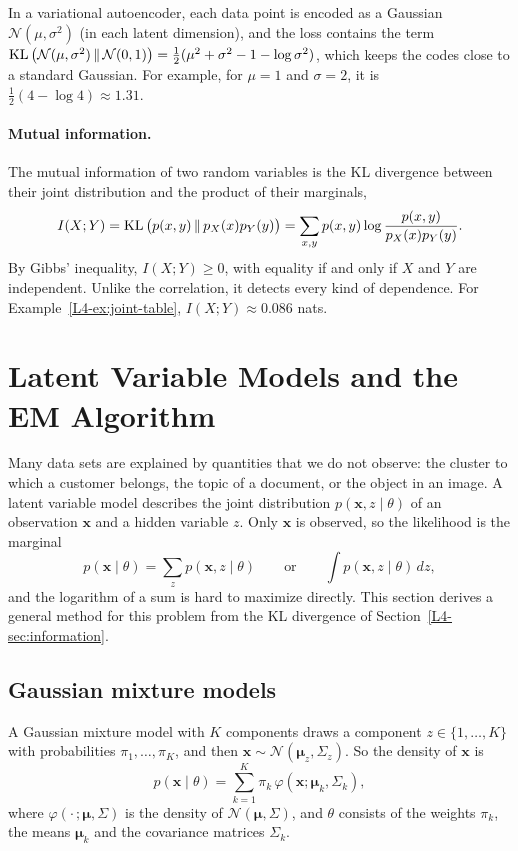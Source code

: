 In a variational autoencoder, each data point is encoded as a Gaussian $\mathcal{N}(\mu, \sigma^2)$ (in each latent dimension), and the loss contains the term $\operatorname{KL}\big(\mathcal{N}(\mu, \sigma^2) \,\|\, \mathcal{N}(0, 1)\big) = \frac{1}{2}(\mu^2 + \sigma^2 - 1 - \log\sigma^2)$, which keeps the codes close to a standard Gaussian. For example, for $\mu = 1$ and $\sigma = 2$, it is $\frac{1}{2}(4 - \log 4) \approx 1.31$.

\paragraph{Mutual information.} The mutual information of two random variables is the KL divergence between their joint distribution and the product of their marginals,
\[I(X; Y) = \operatorname{KL}\big(p(x, y) \,\|\, p_X(x)p_Y(y)\big) = \sum_{x, y} p(x, y)\log\frac{p(x, y)}{p_X(x)p_Y(y)}.\]
By Gibbs' inequality, $I(X; Y) \geq 0$, with equality if and only if $X$ and $Y$ are independent. Unlike the correlation, it detects every kind of dependence. For Example~\ref{L4-ex:joint-table}, $I(X; Y) \approx 0.086$ nats.

\section{Latent Variable Models and the EM Algorithm}\label{L4-sec:latent}

Many data sets are explained by quantities that we do not observe: the cluster to which a customer belongs, the topic of a document, or the object in an image. A latent variable model describes the joint distribution $p(\mathbf{x}, z \mid \theta)$ of an observation $\mathbf{x}$ and a hidden variable $z$. Only $\mathbf{x}$ is observed, so the likelihood is the marginal
\[p(\mathbf{x} \mid \theta) = \sum_z p(\mathbf{x}, z \mid \theta) \qquad \text{or} \qquad \int p(\mathbf{x}, z \mid \theta)\, dz,\]
and the logarithm of a sum is hard to maximize directly. This section derives a general method for this problem from the KL divergence of Section~\ref{L4-sec:information}.

\subsection{Gaussian mixture models}

\begin{definition}\label{L4-def:gmm}
    A Gaussian mixture model with $K$ components draws a component $z \in \{1, \ldots, K\}$ with probabilities $\pi_1, \ldots, \pi_K$, and then $\mathbf{x} \sim \mathcal{N}(\boldsymbol{\mu}_z, \Sigma_z)$. So the density of $\mathbf{x}$ is
    \[p(\mathbf{x} \mid \theta) = \sum_{k=1}^K \pi_k\,\varphi(\mathbf{x}; \boldsymbol{\mu}_k, \Sigma_k),\]
    where $\varphi(\cdot\,; \boldsymbol{\mu}, \Sigma)$ is the density of $\mathcal{N}(\boldsymbol{\mu}, \Sigma)$, and $\theta$ consists of the weights $\pi_k$, the means $\boldsymbol{\mu}_k$ and the covariance matrices $\Sigma_k$.
\end{definition}

